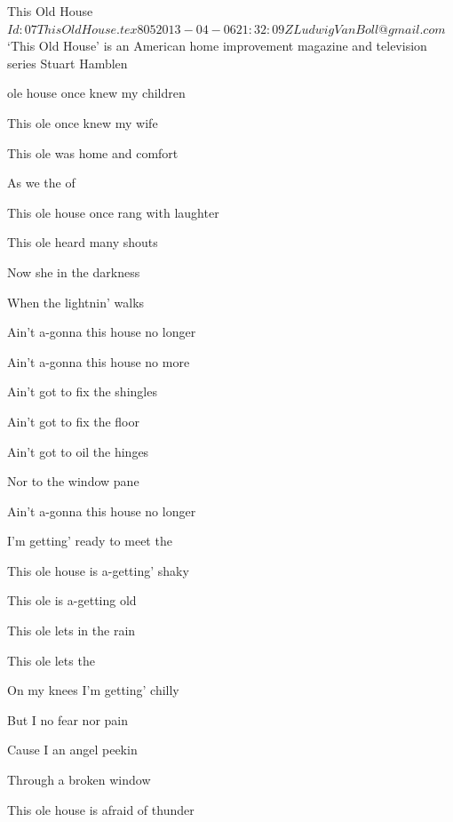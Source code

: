 \begin{SBSong}{This Old House}
  {$Id: 07ThisOldHouse.tex 805 2013-04-06 21:32:09Z LudwigVanBoll@gmail.com $}
  {`This Old House' is an American home improvement magazine and television series}
  {Stuart Hamblen}
  \begin{SBVerse}
	 ole house once knew my children
	
	This ole  once knew my wife
	
	This ole  was home and comfort
	
	As we  the  of 
	
	This ole house once rang with laughter
	
	This ole  heard many shouts
	
	Now she  in the darkness
	
	When the lightnin' walks 
  \end{SBVerse}
  \begin{SBChorus}
    Ain't a-gonna  this house no longer
	
	Ain't a-gonna  this house no more
	
	Ain't got  to fix the shingles
	
	Ain't got  to fix the floor
	
	Ain't got  to oil the hinges
	
	Nor to  the window pane
	
	Ain't a-gonna  this house no longer
	
	I'm getting' ready to meet the 
  \end{SBChorus}
  \begin{SBVerse}
    This ole house is a-getting' shaky
	
	This ole  is a-getting old
	
	This ole  lets in the rain
	
	This ole  lets  the 
	
	On my knees I'm getting' chilly
	
	But I  no fear nor pain
	
	Cause I  an angel peekin
	
	Through a broken window 
  \end{SBVerse}
  \CBPageBrk
  \begin{SBVerse}
    This ole house is afraid of thunder
	

\end{SBVerse}
\end{SBSong}
